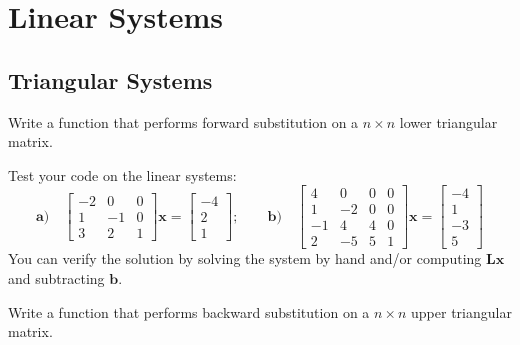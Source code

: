 \chapter{Linear Systems}

\section{Triangular Systems}

\begin{exercise}
    Write a function that performs forward substitution on a $n\times n$ lower triangular matrix.
\end{exercise}

\begin{exercise}
    Test your code on the linear systems:
    $$
        \mathbf{a)}
        \quad 
        \begin{bmatrix}
            -2 & 0 & 0 \\
            1 & -1 & 0 \\
            3 & 2 & 1 
        \end{bmatrix} 
        \mathbf{x} = 
        \begin{bmatrix}
            -4 \\ 2 \\ 1
        \end{bmatrix};
        \qquad
        \mathbf{b)} 
        \quad 
        \begin{bmatrix}
            4 & 0 & 0 & 0 \\
            1 & -2 & 0 & 0 \\
            -1 & 4 & 4 & 0 \\
            2 & -5 & 5 & 1
        \end{bmatrix} 
        \mathbf{x} = 
        \begin{bmatrix}
            -4 \\ 1 \\ -3 \\ 5
        \end{bmatrix}
    $$
    You can verify the solution by solving the system by hand and/or computing $\mathbf{L}\mathbf{x}$ and subtracting $\mathbf{b}$.
\end{exercise}

\begin{exercise}
    Write a function that performs backward substitution on a $n\times n$ upper triangular matrix.
\end{exercise}

